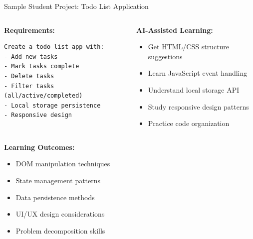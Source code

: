 \documentclass{beamer}
\begin{document}
\begin{frame}[t,fragile]{Sample Student Project: Todo List Application}
    \begin{columns}
        \begin{column}{0.5\textwidth}
            \textbf{Requirements:}
            \begin{lstlisting}[style=code]
Create a todo list app with:
- Add new tasks
- Mark tasks complete
- Delete tasks
- Filter tasks (all/active/completed)
- Local storage persistence
- Responsive design
            \end{lstlisting}
        \end{column}
        \begin{column}{0.5\textwidth}
            \textbf{AI-Assisted Learning:}
            \begin{itemize}
                \item Get HTML/CSS structure suggestions
                \item Learn JavaScript event handling
                \item Understand local storage API
                \item Study responsive design patterns
                \item Practice code organization
            \end{itemize}
        \end{column}
    \end{columns}
    
    \vspace{0.5cm}
    \textbf{Learning Outcomes:}
    \begin{itemize}
        \item DOM manipulation techniques
        \item State management patterns
        \item Data persistence methods
        \item UI/UX design considerations
        \item Problem decomposition skills
    \end{itemize}
\end{frame}
\end{document}
